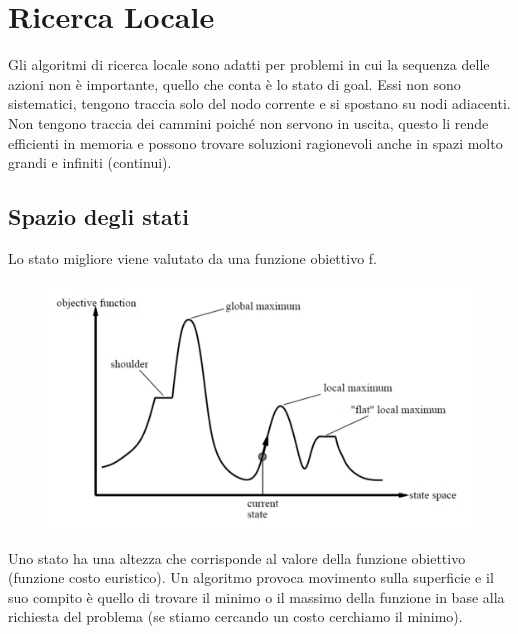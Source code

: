 \documentclass{article}
\begin{document}
\section{Ricerca Locale}
Gli algoritmi di ricerca locale sono adatti per problemi in cui la sequenza delle azioni non è importante, quello che conta è lo stato di goal. Essi non sono sistematici, tengono traccia solo del nodo corrente e si spostano su nodi adiacenti. Non tengono traccia dei cammini poiché non servono in uscita, questo li rende efficienti in memoria e possono trovare soluzioni ragionevoli anche in spazi molto grandi e infiniti (continui). 

\subsection{Spazio degli stati}
Lo stato migliore viene valutato da una funzione obiettivo f.
\begin{figure}[H]
    \centering
    \includegraphics[scale=0.55]{Images/spaziodeglistatilocali.png}
\end{figure}
Uno stato ha una altezza che corrisponde al valore della funzione obiettivo (funzione costo euristico). Un algoritmo provoca movimento sulla superficie e il suo compito è quello di trovare il minimo o il massimo della funzione in base alla richiesta del problema (se stiamo cercando un costo cerchiamo il minimo).
\end{document}
